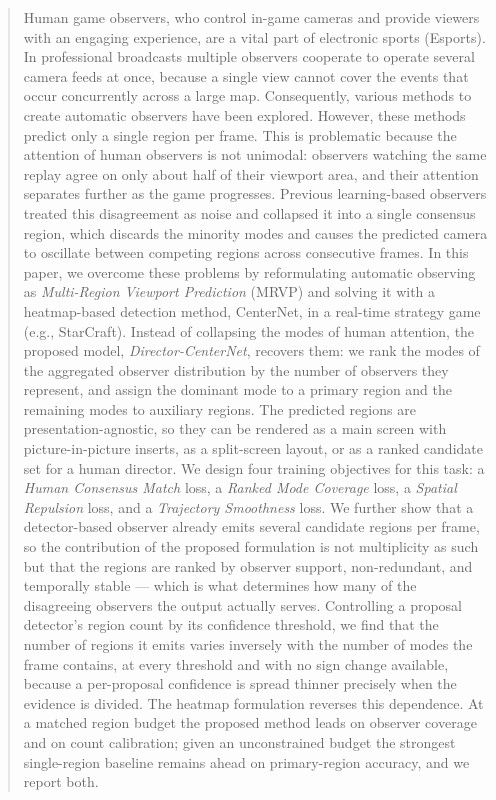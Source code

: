 \documentclass[preprint,12pt]{elsarticle}
\begin{document}
\begin{frontmatter}
\begin{abstract}
Human game observers, who control in-game cameras and provide viewers with an
engaging experience, are a vital part of electronic sports (Esports). In
professional broadcasts multiple observers cooperate to operate several camera
feeds at once, because a single view cannot cover the events that occur
concurrently across a large map. Consequently, various methods to create
automatic observers have been explored. However, these methods predict only a
single region per frame. This is problematic because the attention of human
observers is not unimodal: observers watching the same replay agree on only
about half of their viewport area, and their attention separates further as the
game progresses. Previous learning-based observers treated this disagreement as
noise and collapsed it into a single consensus region, which discards the
minority modes and causes the predicted camera to oscillate between competing
regions across consecutive frames. In this paper, we overcome these problems by
reformulating automatic observing as \emph{Multi-Region Viewport Prediction}
(MRVP) and solving it with a heatmap-based detection method, CenterNet, in a
real-time strategy game (e.g., StarCraft). Instead of collapsing the modes of
human attention, the proposed model, \emph{Director-CenterNet}, recovers them:
we rank the modes of the aggregated observer distribution by the number of
observers they represent, and assign the dominant mode to a primary region and
the remaining modes to auxiliary regions. The predicted regions are
presentation-agnostic, so they can be rendered as a main screen with
picture-in-picture inserts, as a split-screen layout, or as a ranked candidate
set for a human director. We design four training objectives for this task: a
\emph{Human Consensus Match} loss, a \emph{Ranked Mode Coverage} loss, a
\emph{Spatial Repulsion} loss, and a \emph{Trajectory Smoothness} loss.
We further show that a detector-based observer already emits several candidate
regions per frame, so the contribution of the proposed formulation is not
multiplicity as such but that the regions are ranked by observer support,
non-redundant, and temporally stable — which is what determines how many of the
disagreeing observers the output actually serves. Controlling a proposal
detector's region count by its confidence threshold, we find that the number of
regions it emits varies inversely with the number of modes the frame contains,
at every threshold and with no sign change available, because a per-proposal
confidence is spread thinner precisely when the evidence is divided. The
heatmap formulation reverses this dependence. At a matched region budget the
proposed method leads on observer coverage and on count calibration; given an
unconstrained budget the strongest single-region baseline remains ahead on
primary-region accuracy, and we report both.
\end{abstract}


\end{frontmatter}
\end{document}
